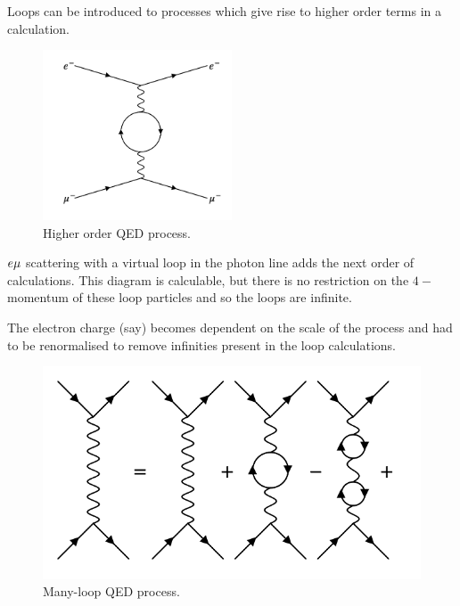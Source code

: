 Loops can be introduced to processes which give rise to higher order terms in a calculation.

\begin{figure}[!htb]
  \begin{center}
    \includegraphics[width=0.5\textwidth]{images/web_feynman/image_80.png}
    \caption[Higher order QED process]{Higher order QED process.}
    \label{fig:ch15_higherOrderQED}
  \end{center}
\end{figure}

$e \mu$ scattering with a virtual loop in the photon line adds the next order of calculations.  This diagram is calculable, but there is no restriction on the $4-$momentum of these loop particles and so the loops are infinite.

The electron charge (say) becomes dependent on the scale of the process and had to be renormalised to remove infinities present in the loop calculations.

\begin{figure}[!htb]
  \begin{center}
    \includegraphics[width=\textwidth]{images/web_feynman/image_81.png}
    \caption[Many-loop QED process]{Many-loop QED process.}
    \label{fig:ch15_manyLoopQED}
  \end{center}
\end{figure}

